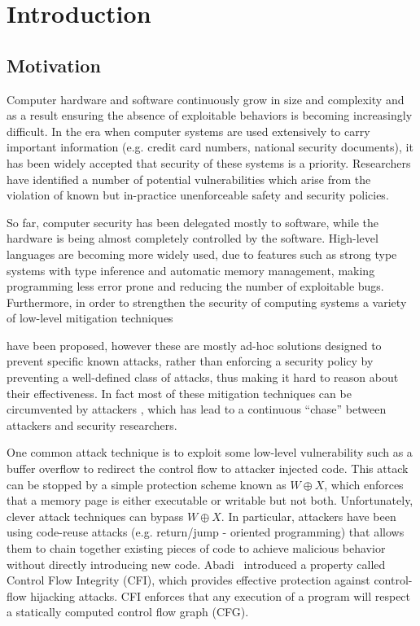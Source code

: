 \chapter{Introduction}\label{ch:introduction}

\section{Motivation}\label{sec:motivation}

Computer hardware and software continuously grow in size and complexity and as a
result ensuring the absence of exploitable behaviors is becoming increasingly 
difficult. In the era when computer systems are used extensively to
carry important information (e.g. credit card numbers, national security
documents), it has been widely accepted that security of these systems is a
priority. Researchers have identified a number of potential vulnerabilities
which arise from the violation of known but in-practice unenforceable safety
and security policies.
 
So far, computer security has been delegated mostly to software, while
the hardware is being almost completely controlled by the software.
High-level languages are becoming more widely used, due to features
such as strong type systems with type inference and automatic memory
management, making programming less error prone and reducing the
number of exploitable bugs. Furthermore, in order to strengthen the
security of computing systems a variety of low-level mitigation
techniques \cite{Cowan:1998:SAA:1267549.1267554,PaX,Erlingsson07}

have been proposed, however these are mostly ad-hoc solutions designed
to prevent specific known attacks, rather than enforcing a security
policy by preventing a well-defined class of attacks, thus making it
hard to reason about their effectiveness. In fact most of these
mitigation techniques can be circumvented by attackers
\cite{Szekeres2013}, which has lead to a continuous ``chase'' between
attackers and security researchers.

One common attack technique is to exploit some low-level vulnerability
such as a buffer overflow to redirect the control flow to attacker
injected code. This attack can be stopped by a simple protection
scheme known as $W \oplus X$, which enforces that a memory page is
either executable or writable but not both.  Unfortunately, clever
attack techniques can bypass $W \oplus X$. In particular, attackers
have been using code-reuse attacks (e.g. return/jump - oriented
programming) that allows them to chain together existing pieces of
code to achieve malicious behavior without directly introducing new
code.  Abadi~\ETAL\cite{abadi2005} introduced a property called
Control Flow Integrity (CFI), which provides effective protection
against control-flow hijacking attacks.  CFI enforces that any
execution of a program will respect a statically computed control flow
graph (CFG).  

